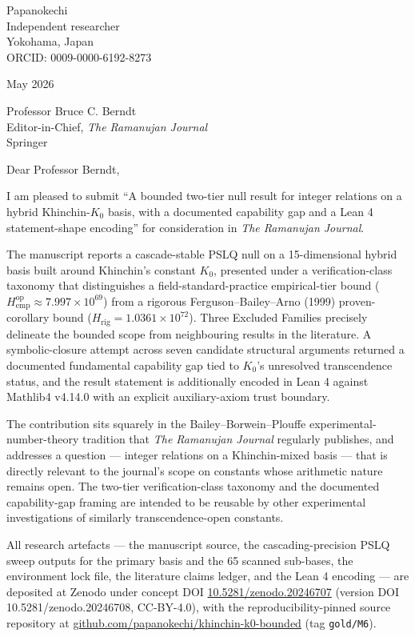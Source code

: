 \documentclass[11pt,a4paper]{article}
\begin{document}
\noindent
Papanokechi \\
Independent researcher \\
Yokohama, Japan \\
ORCID: 0009-0000-6192-8273

\vspace{1em}
 May 2026

\vspace{1.5em}
\noindent
Professor Bruce C. Berndt \\
Editor-in-Chief, \textit{The Ramanujan Journal} \\
Springer

\vspace{1.5em}
\noindent
Dear Professor Berndt,

I am pleased to submit ``A bounded two-tier null result for integer relations on a hybrid Khinchin-$K_{0}$ basis, with a documented capability gap and a Lean 4 statement-shape encoding'' for consideration in \textit{The Ramanujan Journal}.

The manuscript reports a cascade-stable PSLQ null on a 15-dimensional hybrid basis built around Khinchin's constant $K_{0}$, presented under a verification-class taxonomy that distinguishes a field-standard-practice empirical-tier bound ($H_{\mathrm{emp}}^{\mathrm{op}} \approx 7.997 \times 10^{69}$) from a rigorous Ferguson--Bailey--Arno (1999) proven-corollary bound ($H_{\mathrm{rig}} = 1.0361 \times 10^{72}$). Three Excluded Families precisely delineate the bounded scope from neighbouring results in the literature. A symbolic-closure attempt across seven candidate structural arguments returned a documented fundamental capability gap tied to $K_{0}$'s unresolved transcendence status, and the result statement is additionally encoded in Lean 4 against Mathlib4 v4.14.0 with an explicit auxiliary-axiom trust boundary.

The contribution sits squarely in the Bailey--Borwein--Plouffe experimental-number-theory tradition that \textit{The Ramanujan Journal} regularly publishes, and addresses a question --- integer relations on a Khinchin-mixed basis --- that is directly relevant to the journal's scope on constants whose arithmetic nature remains open. The two-tier verification-class taxonomy and the documented capability-gap framing are intended to be reusable by other experimental investigations of similarly transcendence-open constants.

All research artefacts --- the manuscript source, the cascading-precision PSLQ sweep outputs for the primary basis and the 65 scanned sub-bases, the environment lock file, the literature claims ledger, and the Lean 4 encoding --- are deposited at Zenodo under concept DOI \href{https://doi.org/10.5281/zenodo.20246707}{10.5281/zenodo.20246707} (version DOI 10.5281/zenodo.20246708, CC-BY-4.0), with the reproducibility-pinned source repository at \href{https://github.com/papanokechi/khinchin-k0-bounded}{github.com/papanokechi/khinchin-k0-bounded} (tag \texttt{gold/M6}).
\end{document}
